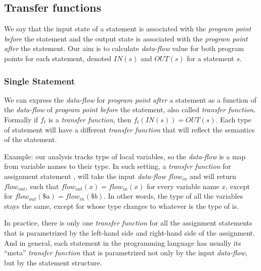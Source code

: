         \subsection{Transfer functions}
        
        We say that the input state of a statement is associated with 
        the \emph{program point before} the statement and the output state 
        is associated with the \emph{program point after} the statement. 
        Our aim is to calculate \emph{data-flow} value for both 
        program points for each statement, denoted $IN(s)$ and $OUT(s)$ for 
        a statement $s$.
        
        \subsubsection*{Single Statement}
        
        We can express the \emph{data-flow} for \emph{program point after} 
        a statement as a function of the \emph{data-flow} of 
        \emph{program point before} the statement, also called \emph{transfer function}. 
        Formally if $f_t$ is a \emph{transfer function}, then $f_t(IN(s))=OUT(s)$.
        Each type of statement will have a different \emph{transfer function} 
        that will reflect the semantics of the statement. 
        
        Example: our analysis tracks type of local variables, so the \emph{data-flow} 
        is a map from variable names to their type. In such setting, a \emph{transfer function} 
        for assignment statement , will take the input \emph{data-flow} 
        $flow_{in}$ and will return $flow_{out}$, such that $flow_{out}(x)=flow_{in}(x)$ for 
        every variable name $x$, except for $flow_{out}(\$a)=flow_{in}(\$b)$. In other words, 
        the type of all the variables stays the same, except for  whose type 
        changes to whatever is the type of  is. 
        
        In practice, there is only one \emph{transfer function} for all the assignment 
        statements that is parametrized by the left-hand side and right-hand side of 
        the assignment. And in general, each statement in the programming language has 
        usually its ``meta'' \emph{transfer function} that is parametrized not only 
        by the input \emph{data-flow}, but by the statement structure.
        
